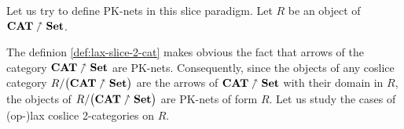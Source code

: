 
Let us try to define PK-nets in this slice paradigm. Let $R$ be an object of $\textbf{CAT}\nnearrow\bf Set$.

The definion \ref{def:lax-slice-2-cat} makes obvious the fact that arrows of the category $\textbf{CAT}\nnearrow\bf Set$ are PK-nets. Consequently, since the objects of any coslice category $R/\big(\textbf{CAT}\nnearrow\bf Set\big)$ are the arrows of $\textbf{CAT}\nnearrow\bf Set$ with their domain in $R$, the objects of  $R/\big(\textbf{CAT}\nnearrow\bf Set\big)$ are PK-nets of form $R$. Let us study the cases of (op-)lax coslice 2-categories on $R$.


